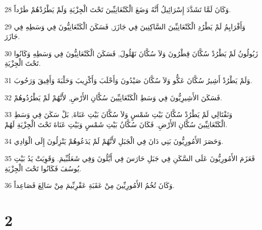 \par 28 وَكَانَ لَمَّا تَشَدَّدَ إِسْرَائِيلُ أَنَّهُ وَضَعَ الْكَنْعَانِيِّينَ تَحْتَ الْجِزْيَةِ وَلَمْ يَطْرُدْهُمْ طَرْداً.
\par 29 وَأَفْرَايِمُ لَمْ يَطْرُدِ الْكَنْعَانِيِّينَ السَّاكِنِينَ فِي جَازَرَ, فَسَكَنَ الْكَنْعَانِيُّونَ فِي وَسَطِهِ فِي جَازَرَ.
\par 30 زَبُولُونُ لَمْ يَطْرُدْ سُكَّانَ قِطْرُونَ وَلاَ سُكَّانَ نَهْلُولَ, فَسَكَنَ الْكَنْعَانِيُّونَ فِي وَسَطِهِ وَكَانُوا تَحْتَ الْجِزْيَةِ.
\par 31 وَلَمْ يَطْرُدْ أَشِيرُ سُكَّانَ عَكُّو وَلاَ سُكَّانَ صَيْدُونَ وَأَحْلَبَ وَأَكْزِيبَ وَحَلْبَةَ وَأَفِيقَ وَرَحُوبَ.
\par 32 فَسَكَنَ الأَشِيرِيُّونَ فِي وَسَطِ الْكَنْعَانِيِّينَ سُكَّانِ الأَرْضِ, لأَنَّهُمْ لَمْ يَطْرُدُوهُمْ.
\par 33 وَنَفْتَالِي لَمْ يَطْرُدْ سُكَّانَ بَيْتِ شَمْسٍ وَلاَ سُكَّانَ بَيْتِ عَنَاةَ, بَلْ سَكَنَ فِي وَسَطِ الْكَنْعَانِيِّينَ سُكَّانِ الأَرْضِ. فَكَانَ سُكَّانُ بَيْتِ شَمْسٍ وَبَيْتِ عَنَاةَ تَحْتَ الْجِزْيَةِ لَهُمْ.
\par 34 وَحَصَرَ الأَمُورِيُّونَ بَنِي دَانَ فِي الْجَبَلِ لأَنَّهُمْ لَمْ يَدَعُوهُمْ يَنْزِلُونَ إِلَى الْوَادِي.
\par 35 فَعَزَمَ الأَمُورِيُّونَ عَلَى السَّكَنِ فِي جَبَلِ حَارَسَ فِي أَيَّلُونَ وَفِي شَعَلُبِّيمَ. وَقَوِيَتْ يَدُ بَيْتِ يُوسُفَ فَكَانُوا تَحْتَ الْجِزْيَةِ.
\par 36 وَكَانَ تُخُمُ الأَمُورِيِّينَ مِنْ عَقَبَةِ عَقْرِبِّيمَ مِنْ سَالِعَ فَصَاعِداً.

\chapter{2}

